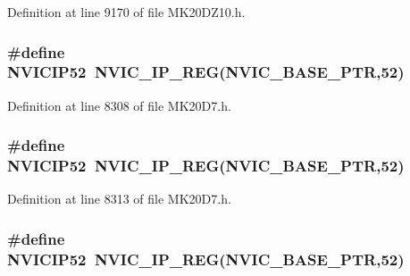 Definition at line 9170 of file M\+K20\+D\+Z10.\+h.

\subsubsection[{\texorpdfstring{N\+V\+I\+C\+I\+P52}{NVICIP52}}]{\setlength{\rightskip}{0pt plus 5cm}\#define N\+V\+I\+C\+I\+P52~{\bf N\+V\+I\+C\+\_\+\+I\+P\+\_\+\+R\+EG}({\bf N\+V\+I\+C\+\_\+\+B\+A\+S\+E\+\_\+\+P\+TR},52)}\hypertarget{group___n_v_i_c___register___accessor___macros_gae981e2d0a06e762336dd46d6f25821bd}{}\label{group___n_v_i_c___register___accessor___macros_gae981e2d0a06e762336dd46d6f25821bd}


Definition at line 8308 of file M\+K20\+D7.\+h.

\subsubsection[{\texorpdfstring{N\+V\+I\+C\+I\+P52}{NVICIP52}}]{\setlength{\rightskip}{0pt plus 5cm}\#define N\+V\+I\+C\+I\+P52~{\bf N\+V\+I\+C\+\_\+\+I\+P\+\_\+\+R\+EG}({\bf N\+V\+I\+C\+\_\+\+B\+A\+S\+E\+\_\+\+P\+TR},52)}\hypertarget{group___n_v_i_c___register___accessor___macros_gae981e2d0a06e762336dd46d6f25821bd}{}\label{group___n_v_i_c___register___accessor___macros_gae981e2d0a06e762336dd46d6f25821bd}


Definition at line 8313 of file M\+K20\+D7.\+h.

\subsubsection[{\texorpdfstring{N\+V\+I\+C\+I\+P52}{NVICIP52}}]{\setlength{\rightskip}{0pt plus 5cm}\#define N\+V\+I\+C\+I\+P52~{\bf N\+V\+I\+C\+\_\+\+I\+P\+\_\+\+R\+EG}({\bf N\+V\+I\+C\+\_\+\+B\+A\+S\+E\+\_\+\+P\+TR},52)}\hypertarget{group___n_v_i_c___register___accessor___macros_gae981e2d0a06e762336dd46d6f25821bd}{}\label{group___n_v_i_c___register___accessor___macros_gae981e2d0a06e762336dd46d6f25821bd}


